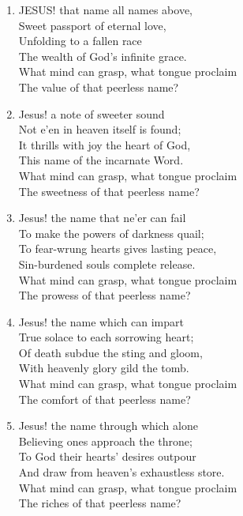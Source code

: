 \documentclass[11pt,a4paper]{article}
\begin{document}
\begin{enumerate}
    \item JESUS! that name all names above, \\
        Sweet passport of eternal love, \\
        Unfolding to a fallen race \\
        The wealth of God's infinite grace. \\
        What mind can grasp, what tongue proclaim \\
        The value of that peerless name?

    \item Jesus! a note of sweeter sound \\
        Not e'en in heaven itself is found; \\
        It thrills with joy the heart of God, \\
        This name of the incarnate Word. \\
        What mind can grasp, what tongue proclaim \\
        The sweetness of that peerless name?

    \item Jesus! the name that ne'er can fail \\
        To make the powers of darkness quail; \\
        To fear-wrung hearts gives lasting peace, \\
        Sin-burdened souls complete release. \\
        What mind can grasp, what tongue proclaim \\
        The prowess of that peerless name?

    \item Jesus! the name which can impart \\
        True solace to each sorrowing heart; \\
        Of death subdue the sting and gloom, \\
        With heavenly glory gild the tomb. \\
        What mind can grasp, what tongue proclaim \\
        The comfort of that peerless name?

    \item Jesus! the name through which alone \\
        Believing ones approach the throne; \\
        To God their hearts' desires outpour \\
        And draw from heaven's exhaustless store. \\
        What mind can grasp, what tongue proclaim \\
        The riches of that peerless name?


\end{enumerate}
\end{document}
